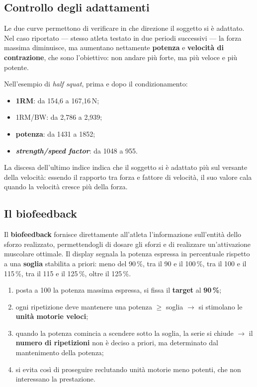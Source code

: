 \subsection{Controllo degli adattamenti}

Le due curve permettono di verificare in che direzione il soggetto si è adattato. Nel caso riportato
  --- stesso atleta testato in due periodi successivi --- la forza massima diminuisce, ma aumentano
  nettamente \textbf{potenza} e \textbf{velocità di contrazione}, che sono l'obiettivo: non andare
  più forte, ma più veloce e più potente.

Nell'esempio di \textit{half squat}, prima e dopo il condizionamento:
\begin{itemize}
  \item \textbf{1RM}: da 154,6 a 167,16\,N;
  \item 1RM/BW: da 2,786 a 2,939;
  \item \textbf{potenza}: da 1431 a 1852;
  \item \textbf{\textit{strength/speed factor}}: da 1048 a 955.
\end{itemize}
La discesa dell'ultimo indice indica che il soggetto si è adattato più sul versante della
velocità: essendo il rapporto tra forza e fattore di velocità, il suo valore cala quando la
velocità cresce più della forza.

\subsection{Il biofeedback}

Il \textbf{biofeedback} fornisce direttamente all'atleta l'informazione sull'entità dello sforzo
  realizzato, permettendogli di dosare gli sforzi e di realizzare un'attivazione muscolare ottimale.
  Il display segnala la potenza espressa in percentuale rispetto a una \textbf{soglia} stabilita a
  priori: meno del 90\,\%, tra il 90 e il 100\,\%, tra il 100 e il 115\,\%, tra il 115 e il 125\,\%,
  oltre il 125\,\%.

\begin{enumerate}
  \item posta a 100 la potenza massima espressa, si fissa il \textbf{target} al \textbf{90\,\%};
  \item ogni ripetizione deve mantenere una potenza $\geq$ soglia $\rightarrow$ si stimolano le
    \textbf{unità motorie veloci};
  \item quando la potenza comincia a scendere sotto la soglia, la serie si chiude $\rightarrow$ il
    \textbf{numero di ripetizioni} non è deciso a priori, ma determinato dal mantenimento della
    potenza;
  \item si evita così di proseguire reclutando unità motorie meno potenti, che non interessano la
    prestazione.
\end{enumerate}
